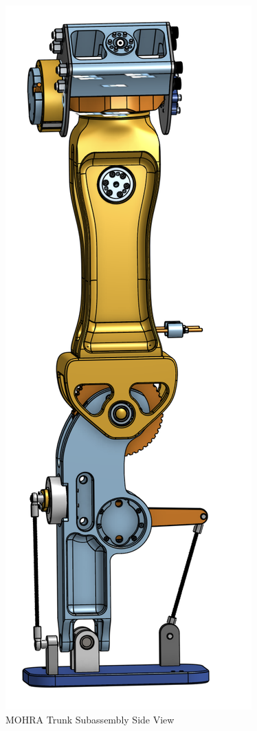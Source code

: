 \documentclass{article}
\begin{document}
\begin{figure}[H]
    \centering
    \includegraphics[scale=0.8]{assets/Design Presentation/Leg Side View.png}
    \caption{MOHRA Trunk Subassembly Side View}
    \label{fig:enter-label}
\end{figure}
\end{document}
